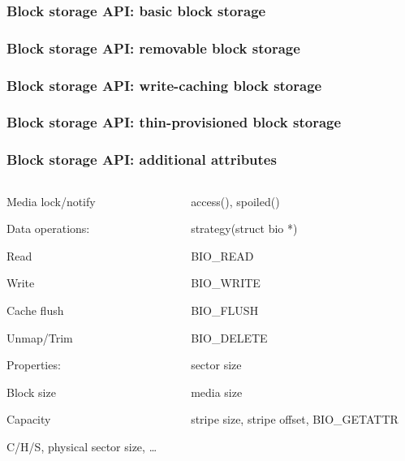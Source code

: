 \documentclass{beamer}
\begin{document}
\begin{frame}
\frametitle<1-2>{Block storage API: basic block storage}
\frametitle<3>{Block storage API: removable block storage}
\frametitle<4>{Block storage API: write-caching block storage}
\frametitle<5>{Block storage API: thin-provisioned block storage}
\frametitle<6>{Block storage API: additional attributes}
\begin{columns}
  \begin{column}{.4\paperwidth}
  \begin{itemize}
 {
  \item{Media lock/notify}
}
  \item{Data operations:
    \begin{itemize}
      \item{Read}
      \item{Write}
 {
      \item{Cache flush}
}
 {
      \item{Unmap/Trim}
}
    \end{itemize}
  }
  \item{Properties:
    \begin{itemize}
      \item{Block size}
      \item{Capacity}
 {
      \item {C/H/S, physical sector size, \ldots}
}
    \end{itemize}
  }
  \end{itemize}
  \end{column}
  \begin{column}{.4\paperwidth}
  \begin{itemize}
 {
  \item{access(), spoiled()}
}
 {
  \item{strategy(struct bio *)
    \begin{itemize}
      \item{BIO\_READ}
      \item{BIO\_WRITE}
 {
      \item{BIO\_FLUSH}
}
 {
      \item{BIO\_DELETE}
}
    \end{itemize}
  }
    \begin{itemize}
      \item{sector size}
      \item{media size}
 {
      \item {stripe size, stripe offset, BIO\_GETATTR }
}
    \end{itemize}
}
  \end{itemize}
  \end{column}
\end{columns}
\end{frame}
\end{document}
